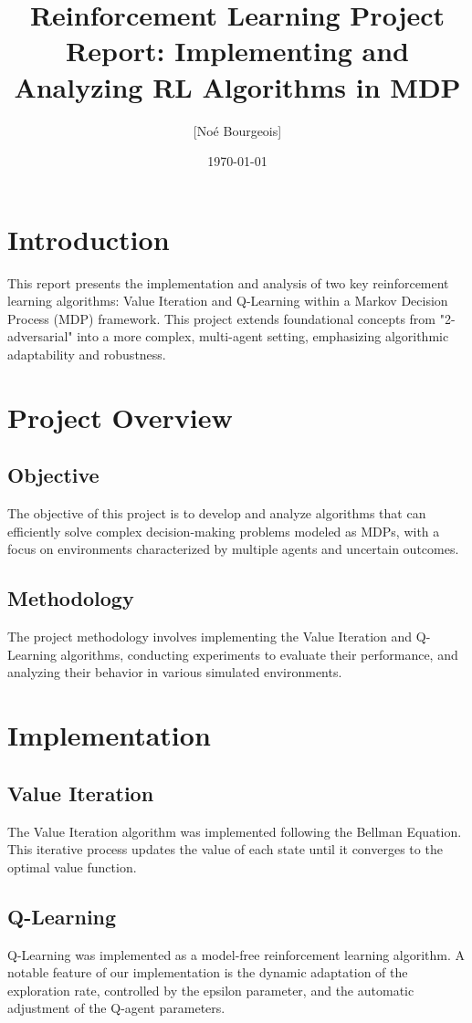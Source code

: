 \documentclass{article}
\title{Reinforcement Learning Project Report: Implementing and Analyzing RL Algorithms in MDP}
\author{[Noé Bourgeois]}
\date{\today}
\begin{document}
\maketitle

\section{Introduction}
This report presents the implementation and analysis of two key reinforcement learning algorithms: 
Value Iteration and Q-Learning within a Markov Decision Process (MDP) framework. 
This project extends foundational concepts from "2-adversarial" into a more complex, 
multi-agent setting, emphasizing algorithmic adaptability and robustness.

\section{Project Overview}
\subsection{Objective}
The objective of this project is to develop and analyze algorithms that can efficiently solve complex decision-making problems modeled as MDPs, 
with a focus on environments characterized by multiple agents and uncertain outcomes.

\subsection{Methodology}
The project methodology involves implementing the Value Iteration and Q-Learning algorithms, 
conducting experiments to evaluate their performance, and analyzing their behavior in various simulated environments.

\section{Implementation}
\subsection{Value Iteration}
The Value Iteration algorithm was implemented following the Bellman Equation. 
This iterative process updates the value of each state until it converges to the optimal value function.

\subsection{Q-Learning}
Q-Learning was implemented as a model-free reinforcement learning algorithm. 
A notable feature of our implementation is 
the dynamic adaptation of the exploration rate, 
controlled by the epsilon parameter, 
and the automatic adjustment of the Q-agent parameters.
\end{document}
